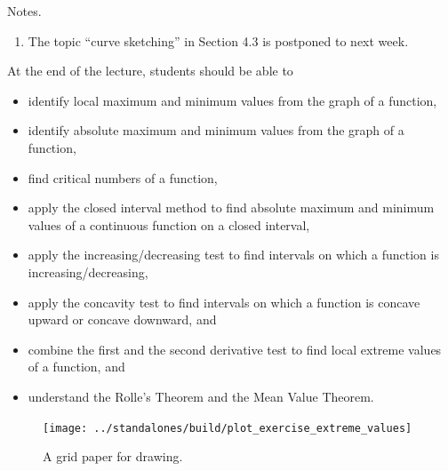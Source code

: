 \documentclass[../main]{subfiles}
\begin{document}
%
%
Notes.
  \begin{enumerate}
    \item The topic ``curve sketching'' in Section 4.3 is postponed to next week.
  \end{enumerate}




%
%

  At the end of the lecture, students should be able to
  \begin{itemize}
    \item identify local maximum and minimum values from the graph of a function, 
    \item identify absolute maximum and minimum values from the graph of a function,
    \item find critical numbers of a function, 
    \item apply the closed interval method to find absolute maximum and minimum values of a continuous function on a closed interval, 
    \item apply the increasing/decreasing test to find intervals on which a function is increasing/decreasing, 
    \item apply the concavity test to find intervals on which a function is concave upward or concave downward, and
    \item combine the first and the second derivative test to find local extreme values of a function, and
    \item understand the Rolle's Theorem and the Mean Value Theorem.
  \end{itemize}




%
%
%


\begin{figure}[h!]
  \centering
  \texttt{[image: ../standalones/build/plot\_exercise\_extreme\_values]}
  \caption{A grid paper for drawing.}
  \label{fig:grid}
\end{figure}
\end{document}
